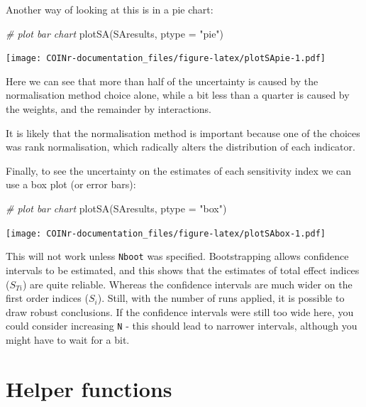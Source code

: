 \documentclass[
]{book}
\newenvironment{Shaded}{\begin{snugshade}}{\end{snugshade}}
\newcommand{\AttributeTok}[1]{\textcolor[rgb]{0.77,0.63,0.00}{#1}}
\newcommand{\CommentTok}[1]{\textcolor[rgb]{0.56,0.35,0.01}{\textit{#1}}}
\newcommand{\FunctionTok}[1]{\textcolor[rgb]{0.00,0.00,0.00}{#1}}
\newcommand{\NormalTok}[1]{#1}
\newcommand{\StringTok}[1]{\textcolor[rgb]{0.31,0.60,0.02}{#1}}
\begin{document}
Another way of looking at this is in a pie chart:

\begin{Shaded}
\begin{Highlighting}[]
\CommentTok{\# plot bar chart}
\FunctionTok{plotSA}\NormalTok{(SAresults, }\AttributeTok{ptype =} \StringTok{"pie"}\NormalTok{)}
\end{Highlighting}
\end{Shaded}

\texttt{[image: COINr-documentation\_files/figure-latex/plotSApie-1.pdf]}

Here we can see that more than half of the uncertainty is caused by the normalisation method choice alone, while a bit less than a quarter is caused by the weights, and the remainder by interactions.

It is likely that the normalisation method is important because one of the choices was rank normalisation, which radically alters the distribution of each indicator.

Finally, to see the uncertainty on the estimates of each sensitivity index we can use a box plot (or error bars):

\begin{Shaded}
\begin{Highlighting}[]
\CommentTok{\# plot bar chart}
\FunctionTok{plotSA}\NormalTok{(SAresults, }\AttributeTok{ptype =} \StringTok{"box"}\NormalTok{)}
\end{Highlighting}
\end{Shaded}

\texttt{[image: COINr-documentation\_files/figure-latex/plotSAbox-1.pdf]}

This will not work unless \texttt{Nboot} was specified. Bootstrapping allows confidence intervals to be estimated, and this shows that the estimates of total effect indices (\(S_{Ti}\)) are quite reliable. Whereas the confidence intervals are much wider on the first order indices (\(S_{i}\)). Still, with the number of runs applied, it is possible to draw robust conclusions. If the confidence intervals were still too wide here, you could consider increasing \texttt{N} - this should lead to narrower intervals, although you might have to wait for a bit.

\hypertarget{helper-functions}{%
\chapter{Helper functions}\label{helper-functions}}
\end{document}
